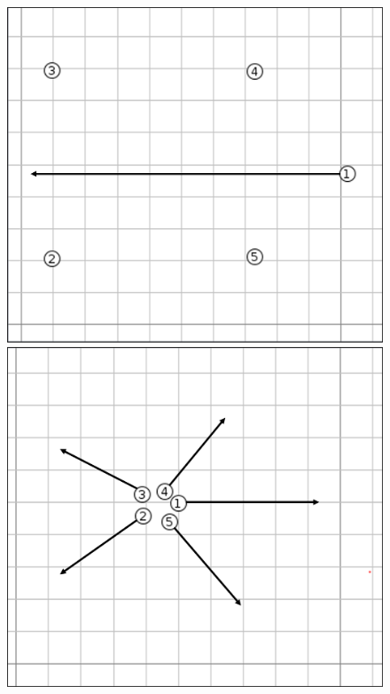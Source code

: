 \documentclass{article}
\begin{document}
\begin{figure}[h]
    \centering
    \begin{minipage}[c]{.3\linewidth}
        \centering
        \includegraphics[cfbox=black 1pt 1pt,scale=0.21]{./simulation2.png}
    \end{minipage}\hspace{10pt}
     \begin{minipage}[c]{.3\linewidth}
        \centering
        \includegraphics[cfbox=black 1pt 1pt,scale=0.21]{./simulation3.png}

\end{minipage}
\end{figure}
\end{document}
